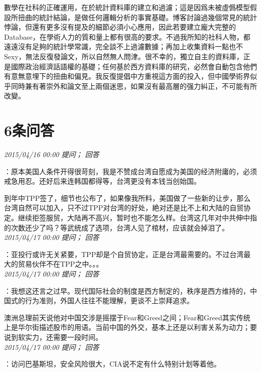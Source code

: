 \documentclass[twocolumn]{ctexart}
\begin{document}
數學在社科的正確運用，在於統計資料庫的建立和過濾；這是因爲未被虛僞模型假設所扭曲的統計結論，是做任何邏輯分析的事實基礎。博客討論過幾個常見的統計悖論，但還有更多沒有提及的細節必須小心應用，因此若要建立龐大完整的Database，在學術人力的質和量上都有很高的要求。不過我所知的社科人物，都遠遠沒有足夠的統計學常識，完全談不上過濾數據；再加上收集資料一點也不Sexy，無法反復發論文，所以自然無人問津。很不幸的，獨立自主的資料庫，正是國際政治經濟話語權的基礎；任何基於西方資料庫的研究，必然會自動包含他們有意無意埋下的扭曲和偏見。我反復提倡中方重視這方面的投入，但中國學術界似乎同時兼有著崇外和論文至上兩個迷思，如果沒有最高層的强力糾正，不可能有所改變。
\\

\section{6条问答}

\textit{\hfill\noindent\small 2015/04/16 00:00 提问； 回答}

：原本美国人条件开得很苛刻，我是不赞成台湾自愿成为美国的经济附庸的，必须戒急用忍。还好后来连韩国都得等，台湾更没有本钱当创始国。

到年中TPP签了，细节也公布了，如果像我所料，美国做了一些新的让步，那么台湾自然可以加入，只不过TPP对台湾的好处，絶对还是比不上和大陆的自贸协定。继续拒签服贸，大陆再不高兴，暂时也不能怎么样。台湾这几年对中共伸中指的次数还少了吗？等武统成了选项，台湾人见了棺材，应该就会掉泪了。\\

\textit{\hfill\noindent\small 2015/04/17 00:00 提问； 回答}

：亚投行或许无关紧要，TPP却是个自贸协定，正是台湾最需要的。不过台湾最大的贸易伙伴不在TPP之中。。。\\

\textit{\hfill\noindent\small 2015/04/17 00:00 提问； 回答}

：我想这还言之过早。现代国际社会的制度是西方制定的，秩序是西方维持的，中国式的行为准则，外国人往往不能理解，更谈不上崇拜追求。

澳洲总理前天说他对中国交涉是摇摆于Fear和Greed之间；Fear和Greed其实传统上是华尔街描述股市的用语。当前中国的外交，基本上还是以利害关系为动力；要说到软实力，还需要一段时间。\\

\textit{\hfill\noindent\small 2015/04/17 00:00 提问； 回答}

：访问巴基斯坦，安全风险很大，CIA说不定有什么特别计划等着他。\\
\end{document}
